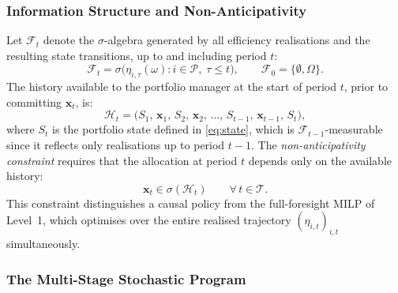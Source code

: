 \subsubsection{Information Structure and Non-Anticipativity}
\label{subsubsec:l2_filtration}

Let $\mathcal{F}_t$ denote the $\sigma$-algebra generated by all
efficiency realisations and the resulting state transitions, up to and
including period $t$:
\begin{equation}
  \mathcal{F}_t = \sigma\!\bigl(
    \eta_{i,\tau}(\omega) : i \in \mathcal{P},\; \tau \leq t
  \bigr),
  \qquad \mathcal{F}_0 = \{\emptyset, \Omega\}.
  \label{eq:filtration}
\end{equation}
The history available to the portfolio manager at the start of period
$t$, prior to committing $\mathbf{x}_t$, is:
\begin{equation}
  \mathcal{H}_t = \bigl(S_1,\, \mathbf{x}_1,\,
                         S_2,\, \mathbf{x}_2,\, \ldots,\,
                         S_{t-1},\, \mathbf{x}_{t-1},\, S_t\bigr),
  \label{eq:history}
\end{equation}
where $S_t$ is the portfolio state defined in \eqref{eq:state}, which
is $\mathcal{F}_{t-1}$-measurable since it reflects only realisations
up to period $t-1$. The \emph{non-anticipativity constraint} requires
that the allocation at period $t$ depends only on the available history:
\begin{equation}
  \mathbf{x}_t \in \sigma(\mathcal{H}_t)
  \qquad \forall\, t \in \mathcal{T}.
  \label{eq:nonanticipativity}
\end{equation}
This constraint distinguishes a causal policy from the full-foresight
MILP of Level~1, which optimises over the entire realised trajectory
$(\eta_{i,t})_{i,t}$ simultaneously.

\subsubsection{The Multi-Stage Stochastic Program}
\label{subsubsec:l2_mssp}

